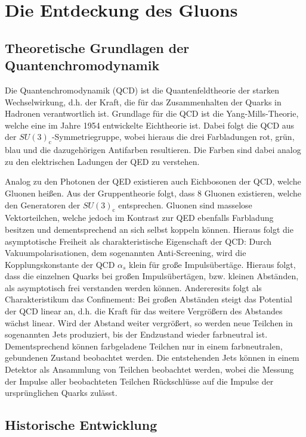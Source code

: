 
\section{Die Entdeckung des Gluons}


\subsection{Theoretische Grundlagen der Quantenchromodynamik}
Die Quantenchromodynamik (QCD) ist die Quantenfeldtheorie der starken Wechselwirkung, d.h. der Kraft, die für das Zusammenhalten der Quarks in Hadronen verantwortlich ist.
Grundlage für die QCD ist die Yang-Mills-Theorie, welche eine im Jahre 1954 entwickelte Eichtheorie ist.
Dabei folgt die QCD aus der $SU(3)_\text{c}$-Symmetriegruppe, wobei hieraus die drei Farbladungen rot, grün, blau und die dazugehörigen Antifarben resultieren.
Die Farben sind dabei analog zu den elektrischen Ladungen der QED zu verstehen.

Analog zu den Photonen der QED existieren auch Eichbosonen der QCD, welche Gluonen heißen.
Aus der Gruppentheorie folgt, dass 8 Gluonen existieren, welche den Generatoren der $SU(3)_\text{c}$ entsprechen.
Gluonen sind masselose Vektorteilchen, welche jedoch im Kontrast zur QED ebenfalls Farbladung besitzen und dementsprechend an sich selbst koppeln können.
Hieraus folgt die asymptotische Freiheit als charakteristische Eigenschaft der QCD:
Durch Vakuumpolarisationen, dem sogenannten Anti-Screening, wird die Kopplungskonstante der QCD $\alpha_{s}$ klein für große Impulsübertäge. 
Hieraus folgt, dass die einzelnen Quarks bei großen Impulsübertägen, bzw. kleinen Abständen, als asymptotisch frei verstanden werden können.
Andereresits folgt als Charakteristikum das Confinement: Bei großen Abständen steigt das Potential der QCD linear an, d.h. die Kraft für das weitere Vergrößern des Abstandes wächst linear.
Wird der Abstand weiter vergrößert, so werden neue Teilchen in sogenannten Jets produziert, bis der Endzustand wieder farbneutral ist.
Dementsprechend können farbgeladene Teilchen nur in einem farbneutralen, gebundenen Zustand beobachtet werden.
Die entstehenden Jets können in einem Detektor als Ansammlung von Teilchen beobachtet werden, wobei die Messung der Impulse aller beobachteten Teilchen Rückschlüsse auf die Impulse der ursprünglichen Quarks zulässt.

\subsection{Historische Entwicklung}

